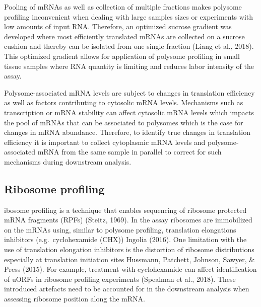 \documentclass[
  12pt,
  openany]{book}
\begin{document}
Pooling of mRNAs as well as collection of multiple fractions makes polysome profiling inconvenient when dealing with large samples sizes or experiments with low amounts of input RNA. Therefore, an optimized sucrose gradient was developed where most efficiently translated mRNAs are collected on a sucrose cushion and thereby can be isolated from one single fraction (Liang et al., 2018). This optimized gradient allows for application of polysome profiling in small tissue samples where RNA quantity is limiting and reduces labor intensity of the assay.

Polysome-associated mRNA levels are subject to changes in translation efficiency as well as factors contributing to cytosolic mRNA levels. Mechanisms such as transcription or mRNA stability can affect cytosolic mRNA levels which impacts the pool of mRNAs that can be associated to polysomes which is the case for changes in mRNA abundance. Therefore, to identify true changes in translation efficiency it is important to collect cytoplasmic mRNA levels and polysome-associated mRNA from the same sample in parallel to correct for such mechanisms during downstream analysis.

\subsection{Ribosome profiling} \label{riboseq}

ibosome profiling is a technique that enables sequencing of ribosome protected mRNA fragments (RPFs) (Steitz, 1969). In the assay ribosomes are immobilized on the mRNAs using, similar to polysome profiling, translation elongations inhibitors (e.g.~cyclohexamide (CHX)) Ingolia (2016). One limitation with the use of translation elongation inhibitors is the distortion of ribosome distributions especially at translation initiation sites Hussmann, Patchett, Johnson, Sawyer, \& Press (2015). For example, treatment with cyclohexamide can affect identification of uORFs in ribosome profiling experiments (Spealman et al., 2018). These introduced artefacts need to be accounted for in the downstream analysis when assessing ribosome position along the mRNA.
\end{document}

